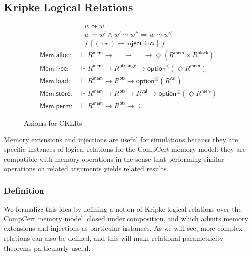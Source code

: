 \documentclass[acmsmall,timestamp,review]{acmart}
\newcommand{\kw}[1]{\ensuremath{ \mathsf{#1} }}
\newcommand{\ifr}[1]{\ [{#1}]\ }
\begin{document}

\subsection{Kripke Logical Relations} %

\begin{figure} %
  \begin{gather*}
    w \leadsto w \\
    w \leadsto w' \wedge w' \leadsto w'' \Rightarrow w \leadsto w'' \\
    f \ifr{(\leadsto) \rightarrow \kw{inject\_incr}} f
  \end{gather*}
  \begin{align*}
      \kw{Mem.alloc} :
        &\Vdash R^\kw{mem} \rightarrow {=} \rightarrow {=} \rightarrow
        \Diamond (R^\kw{mem} \times R^\kw{block})
      \\
      \kw{Mem.free} :
        &\Vdash R^\kw{mem} \rightarrow R^\kw{ptrrange} \rightarrow
        \kw{option}^\le(\Diamond R^\kw{mem})
      \\
      \kw{Mem.load} :
        &\Vdash R^\kw{mem} \rightarrow R^\kw{ptr} \rightarrow
        \kw{option}^\le(R^\kw{val})
      \\
      \kw{Mem.store} :
        &\Vdash R^\kw{mem} \rightarrow R^\kw{ptr} \rightarrow R^\kw{val} \rightarrow
        \kw{option}^\le(\Diamond R^\kw{mem})
      \\
      \kw{Mem.perm} :
        &\Vdash R^\kw{mem} \rightarrow R^\kw{ptr} \rightarrow {\subseteq}
  \end{align*}
  \caption{Axioms for CKLRs}
  \label{fig:cklr-def}
\end{figure}

Memory extensions and injections
are useful for simulations
because they are specific instances
of logical relations for the CompCert memory model:
they are compatible with memory operations
in the sense that
performing similar operations on related arguments
yields related results.

\subsubsection{Definition}

We formalize this idea by defining
a notion of Kripke logical relations over the CompCert memory model,
closed under composition, and which
admits memory extensions and injections as particular instances.
As we will see,
more complex relations can also be defined,
and this will make relational parametricity theorems
particularly useful.
\end{document}
